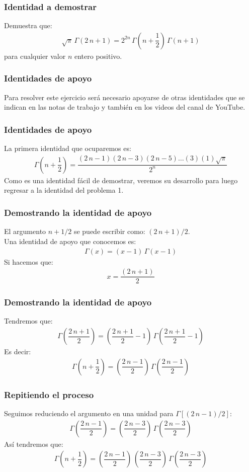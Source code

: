 \documentclass[12pt]{beamer}
\begin{document}
\begin{frame}
\frametitle{Identidad a demostrar}
Demuestra que:
\begin{align*}
\sqrt{\pi} \, \Gamma(2 \, n + 1) = 2^{2n} \, \Gamma \left( n + \dfrac{1}{2} \right) \, \Gamma(n + 1)
\end{align*}
para cualquier valor $n$ entero positivo.
\end{frame}
\begin{frame}
\frametitle{Identidades de apoyo}
Para resolver este ejercicio será necesario apoyarse de otras identidades que se indican en las notas de trabajo y también en los videos del canal de YouTube.
\end{frame}
\begin{frame}
\frametitle{Identidades de apoyo}
La primera identidad que ocuparemos es:
\pause
\begin{align*}
\Gamma\left( n + \dfrac{1}{2} \right) = \dfrac{(2 \, n {-} 1)(2 \, n {-} 3)(2 \, n {-} 5) \ldots (3)(1)\sqrt{\pi}}{2^{n}}
\end{align*}
\pause
Como es una identidad fácil de demostrar, veremos su desarrollo para luego regresar a la identidad del problema 1.
\end{frame}
\begin{frame}
\frametitle{Demostrando la identidad de apoyo}
El argumento $n + 1/2$ se puede escribir como: $(2 \, n + 1)/2$.
\\
\bigskip
\pause
Una identidad de apoyo que conocemos es:
\pause
\begin{align*}
\Gamma(x) = (x - 1) \, \Gamma (x - 1)
\end{align*}
\pause
Si hacemos que:
\begin{align*}
x = \dfrac{(2 \, n + 1)}{2}
\end{align*}
\end{frame}
\begin{frame}
\frametitle{Demostrando la identidad de apoyo}
Tendremos que:
\pause
\begin{align*}
\Gamma \left( \dfrac{2 \, n + 1}{2} \right) = \left( \dfrac{2 \, n + 1}{2} - 1 \right) \, \Gamma \left( \dfrac{2 \, n + 1}{2} - 1 \right)
\end{align*}
\pause
Es decir:
\begin{align*}
\Gamma \left( n + \dfrac{1}{2} \right) = \left( \dfrac{2 \, n - 1}{2} \right) \, \Gamma \left( \dfrac{2 \, n - 1}{2} \right)
\end{align*}
\end{frame}
\begin{frame}
\frametitle{Repitiendo el proceso}
Seguimos reduciendo el argumento en una unidad para $\Gamma [(2 \, n - 1)/2]$:
\pause
\begin{align*}
\Gamma \left( \dfrac{2 \, n - 1}{2} \right) = \left( \dfrac{2 \, n - 3}{2} \right) \, \Gamma \left( \dfrac{2 \, n - 3}{2} \right)
\end{align*}
\pause
Así tendremos que:
\begin{align*}
\Gamma \left( n + \dfrac{1}{2} \right) = \left( \dfrac{2 \, n - 1}{2} \right) \, \left( \dfrac{2 \, n - 3}{2} \right) \, \Gamma \left( \dfrac{2 \, n - 3}{2} \right)
\end{align*}
\end{frame}
\end{document}
